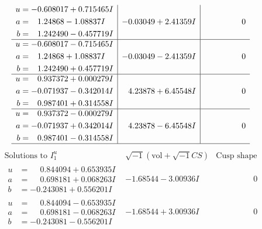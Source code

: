 \documentclass[1p]{elsarticle_modified}
\theoremstyle{definition}
\newcommand{\I}{\sqrt{-1}}
\begin{document}
$$\begin{array}{c|c|c}
\begin{aligned}
u &= -0.608017 + 0.715465 I \\
a &= \phantom{-}1.24868 - 1.08837 I \\
b &= \phantom{-}1.242490 - 0.457719 I\end{aligned}
 & -0.03049 + 2.41359 I & \phantom{-0.000000 } 0 \\ \hline\begin{aligned}
u &= -0.608017 - 0.715465 I \\
a &= \phantom{-}1.24868 + 1.08837 I \\
b &= \phantom{-}1.242490 + 0.457719 I\end{aligned}
 & -0.03049 - 2.41359 I & \phantom{-0.000000 } 0 \\ \hline\begin{aligned}
u &= \phantom{-}0.937372 + 0.000279 I \\
a &= -0.071937 - 0.342014 I \\
b &= \phantom{-}0.987401 + 0.314558 I\end{aligned}
 & \phantom{-}4.23878 + 6.45548 I & \phantom{-0.000000 } 0 \\ \hline\begin{aligned}
u &= \phantom{-}0.937372 - 0.000279 I \\
a &= -0.071937 + 0.342014 I \\
b &= \phantom{-}0.987401 - 0.314558 I\end{aligned}
 & \phantom{-}4.23878 - 6.45548 I & \phantom{-0.000000 } 0\\
 \hline 
 \end{array}$$\newpage$$\begin{array}{c|c|c}  
\text{Solutions to }I^u_{1}& \I (\text{vol} + \sqrt{-1}CS) & \text{Cusp shape}\\
 \hline 
\begin{aligned}
u &= \phantom{-}0.844094 + 0.653935 I \\
a &= \phantom{-}0.698181 + 0.068263 I \\
b &= -0.243081 + 0.556201 I\end{aligned}
 & -1.68544 - 3.00936 I & \phantom{-0.000000 } 0 \\ \hline\begin{aligned}
u &= \phantom{-}0.844094 - 0.653935 I \\
a &= \phantom{-}0.698181 - 0.068263 I \\
b &= -0.243081 - 0.556201 I\end{aligned}
 & -1.68544 + 3.00936 I & \phantom{-0.000000 } 0 \\ \hline\begin{aligned}

\end{aligned}
\end{array}$$
\end{document}
